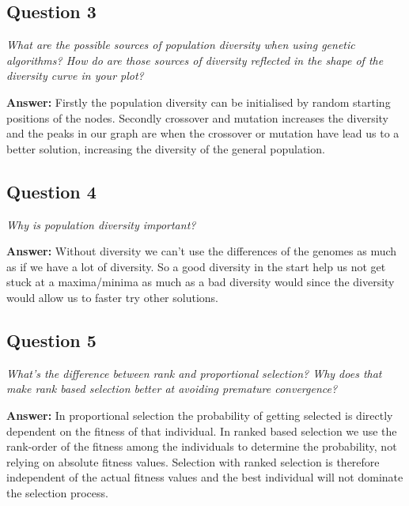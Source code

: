 \documentclass[a4paper]{article}
\begin{document}
\subsection*{Question 3}
\emph{What are the possible sources of population diversity when using
genetic algorithms? How do are those sources of diversity reflected in the shape of the diversity curve in your plot?}

\textbf{Answer:} 
Firstly the population diversity can be initialised by random starting positions of the nodes. Secondly crossover and mutation increases the diversity and the peaks in our graph are when the crossover or mutation have lead us to a better solution, increasing the diversity of the general population. 

\subsection*{Question 4}
\emph{Why is population diversity important?}

\textbf{Answer:} Without diversity we can't use the differences of the genomes as much as if we have a lot of diversity. So a good diversity in the start help us not get stuck at a maxima/minima as much as a bad diversity would since the diversity would allow us to faster try other solutions.

\subsection*{Question 5}
\emph{What's the difference between rank and proportional selection?
Why does that make rank based selection better at avoiding premature convergence?}

\textbf{Answer:} In proportional selection the probability of getting selected is directly dependent on the fitness of that individual. In ranked based selection we use the rank-order of the fitness among the individuals to determine the probability, not relying on absolute fitness values. Selection with ranked selection is therefore independent of the actual fitness values and the best individual will not dominate the selection process. %
\end{document}
